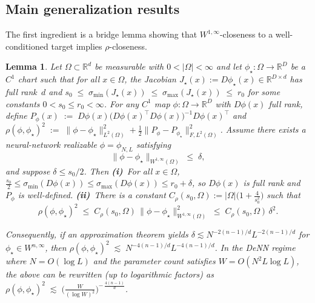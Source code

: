 \documentclass[11pt]{article}
\newcommand{\R}{\mathbb{R}}
\newcommand{\Om}{\Omega}
\newcommand{\Rd}{\mathbb{R}^d}
\newcommand{\RD}{\mathbb{R}^D}
\newcommand{\norm}[1]{\lVert#1\rVert}
\newcommand{\abs}[1]{|#1|}
\newcommand{\sigmin}{\sigma_{\min}}
\newcommand{\sigmax}{\sigma_{\max}}
\newtheorem{lem}[thm]{Lemma}
\begin{document}
\subsection{Main generalization results}%
\label{ssec:rho-from-W1infty}\label{ssec:main-gen-thm}

The first ingredient is a bridge lemma showing that
$W^{1,\infty}$-closeness to a well-conditioned target implies
$\rho$-closeness.

\begin{lem}\label{lem:rho-approx-from-W1infty}
Let $\Om\subset\Rd$ be measurable with $0<\abs{\Om}<\infty$ and let
$\phi_\star:\Om\to\RD$ be a $C^1$ chart such that for all $x\in \Om$,
the Jacobian $J_\star(x):=D\phi_\star(x)\in\R^{D\times d}$ has full
rank~$d$ and
$s_0 \;\le\; \sigmin(J_\star(x))
  \;\le\; \sigmax(J_\star(x)) \;\le\; r_0$
  for some constants $0<s_0\le r_0<\infty$. 
For any $C^1$ map $\phi:\Om\to\RD$ with $D\phi(x)$ full rank, define
$P_\phi(x)
  \;:=\;
D\phi(x)\big(D\phi(x)^\top D\phi(x)\big)^{-1}D\phi(x)^\top$ and
  $\rho(\phi,\phi_\star)^2
  \;:=\;
  \norm{\phi-\phi_\star}_{L^2(\Om)}^2
  +\tfrac12\norm{P_\phi-P_{\phi_\star}}_{F,L^2(\Om)}^2$.
Assume there exists a neural-network realizable
$\phi=\phi_{N,L}$ satisfying
\begin{equation}\label{eq:W1infty-approx}
  \norm{\phi-\phi_\star}_{W^{1,\infty}(\Om)} \;\le\; \delta,
\end{equation}
and suppose $\delta \le s_0/2$.  Then
\textup{\textbf{(i)}}~For all $x\in \Om$,
$\tfrac{s_0}{2}
\le \sigmin(D\phi(x))
\le \sigmax(D\phi(x))
\le r_0+\delta$,
so $D\phi(x)$ is full rank and $P_\phi$ is well-defined.
\textup{\textbf{(ii)}}~There is a constant
$C_{\rho}(s_0,\Om):=\abs{\Om}\bigl(1+\frac{4}{s_0^2}\bigr)$
such that
\begin{equation}\label{eq:rho-from-W1infty}
  \rho(\phi,\phi_\star)^2
  \;\le\;
  C_{\rho}(s_0,\Om)\,
  \norm{\phi-\phi_\star}_{W^{1,\infty}(\Om)}^2
  \;\le\;
  C_{\rho}(s_0,\Om)\,\delta^2.
\end{equation}

Consequently, if an approximation theorem yields
$\delta \lesssim N^{-2(n-1)/d}L^{-2(n-1)/d}$ for
$\phi_\star\in W^{n,\infty}$, then
  $\rho(\phi,\phi_\star)^2
  \;\lesssim\;
  N^{-4(n-1)/d}L^{-4(n-1)/d}$.
In the DeNN regime where $N=O(\log L)$ and the parameter count
satisfies $W=O(N^2L\log L)$, the above can be rewritten (up to
logarithmic factors) as
$\rho(\phi,\phi_\star)^2
  \;\lesssim\;
  \Big(\frac{W}{(\log W)^2}\Big)^{-\,\frac{4(n-1)}{d}}$.
\end{lem}
\end{document}
